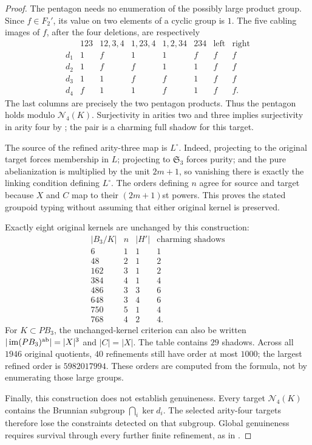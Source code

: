 \begin{proof}
The pentagon needs no enumeration of the possibly large product
group. Since $f\in F_2'$, its value on two elements of a cyclic
group is $1$. The five cabling images of $f$, after the four
deletions, are respectively
\[
\begin{array}{c|ccccc|cc}
 &123&12,3,4&1,23,4&1,2,34&234&\text{left}&\text{right}\\\hline
 d_1&1&f&1&1&f&f&f\\
 d_2&1&f&f&1&1&f&f\\
 d_3&1&1&f&f&1&f&f\\
 d_4&f&1&1&f&1&f&f.
\end{array}
\]
The last columns are precisely the two pentagon products.
Thus the pentagon holds modulo $\mathcal N_4(K)$.
Surjectivity in arities two and three implies surjectivity in
arity four by \citet[Proposition~2.10]{DolgushevLeLorenz2024};
the pair is a charming full shadow for this target.

The source of the refined arity-three map is $L^\circ$.
Indeed, projecting to the original target forces membership in
$L$; projecting to $\mathfrak S_3$ forces purity; and the pure
abelianization is multiplied by the unit $2m+1$, so vanishing
there is exactly the linking condition defining $L^\circ$.
The orders defining $n$ agree for source and target because
$X$ and $C$ map to their $(2m+1)$st powers. This proves the
stated groupoid typing without assuming that either original
kernel is preserved.

Exactly eight original kernels are unchanged by this construction:
\[
\begin{array}{r|r|r|r}
 |B_3/K|&n&|H'|&\text{charming shadows}\\\hline
 6&1&1&1\\48&2&1&2\\162&3&1&2\\384&4&1&4\\
 486&3&3&6\\648&3&4&6\\750&5&1&4\\768&4&2&4.
\end{array}
\]
For $K\subset PB_3$, the unchanged-kernel criterion can also be
written $|\operatorname{im}(PB_3)^{\rm ab}|=|X|^3$ and
$|C|=|X|$. The table contains $29$ shadows. Across all $1946$
original quotients, $40$ refinements still have order at most
$1000$; the largest refined order is $5982017994$.
These orders are computed from the formula, not by enumerating
those large groups.

Finally, this construction does not establish genuineness.
Every target $\mathcal N_4(K)$ contains the Brunnian subgroup
$\bigcap_i\ker d_i$. The selected arity-four targets therefore
lose the constraints detected on that subgroup. Global
genuineness requires survival through every further finite
refinement, as in \citet[Corollary~3.13]{DolgushevLeLorenz2024}.
\end{proof}

